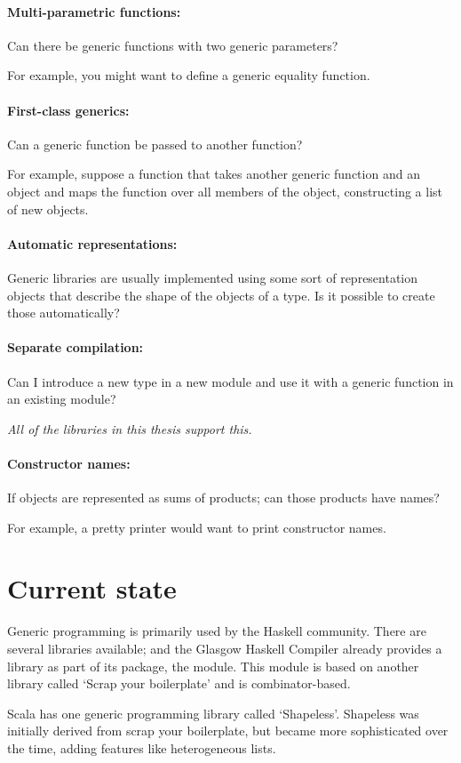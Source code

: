 \paragraph{Multi-parametric functions:} Can there be generic functions with two generic parameters?

For example, you might want to define a generic equality function.

\paragraph{First-class generics:} Can a generic function be passed to another function?

For example, suppose a function  that takes another generic function 
and an object and maps the function  over all members of the object, constructing
a list of new objects.

\paragraph{Automatic representations:} Generic libraries are usually implemented
using some sort of representation objects that describe the shape of the
objects of a type. Is it possible to create those automatically?

\paragraph{Separate compilation:} Can I introduce a new type in a new module
and use it with a generic function in an existing module?

\textit{All of the libraries in this thesis support this.}

\paragraph{Constructor names:} If objects are represented as sums of products;
can those products have names?

For example, a pretty printer would want to print constructor names.


\section*{Current state}
Generic programming is primarily used by the Haskell community. There are
several libraries available; and the Glasgow Haskell Compiler already provides
a library as part of its  package, the  module. This
module is based on another library called `Scrap your boilerplate'\cite{DBLP:conf/tldi/LammelJ03}
and is combinator-based.

Scala has one generic programming library called `Shapeless'. Shapeless was
initially derived from scrap your boilerplate, but became more sophisticated
over the time, adding features like heterogeneous lists.
